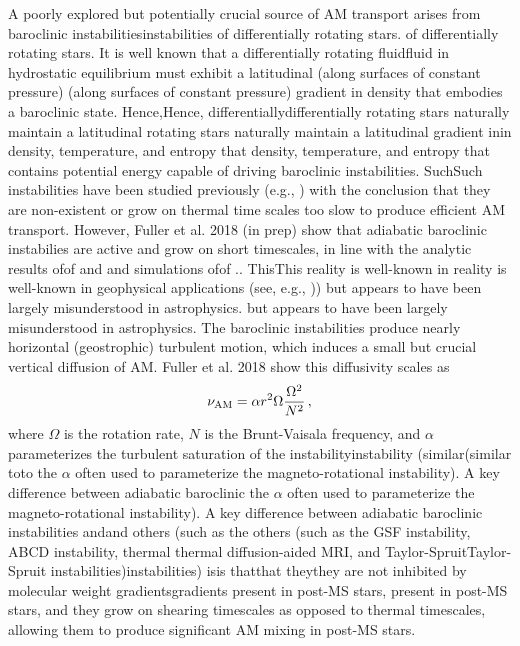 A poorly explored but potentially crucial source of AM transport arises from baroclinic instabilitiesinstabilities of differentially rotating stars. of differentially rotating stars. It is well known that a differentially rotating fluidfluid in hydrostatic equilibrium must exhibit a latitudinal (along surfaces of constant pressure) (along surfaces of constant pressure) gradient in density that embodies a baroclinic state. Hence,Hence, differentiallydifferentially rotating stars naturally maintain a latitudinal rotating stars naturally maintain a latitudinal gradient inin density, temperature, and entropy that density, temperature, and entropy that contains potential energy capable of driving baroclinic instabilities. SuchSuch instabilities have been studied previously (e.g., \citealt{goldreich:67,knobloch:82,knobloch:83,spruit:83,spruit:84,zahn:93}) with the conclusion that they are non-existent or grow on thermal time scales too slow to produce efficient AM transport. However, Fuller et al. 2018 (in prep) show that adiabatic baroclinic instabilies are active and grow on short timescales, in line with the analytic results ofof \citep{tassoul:82,fujimoto:87,fujimoto:88} and \citep{tassoul:82,fujimoto:87,fujimoto:88} and simulations ofof \cite{simitev:17}.\cite{simitev:17}. ThisThis reality is well-known in reality is well-known in geophysical applications (see, e.g., \citealt{pedlosky:92})\citealt{pedlosky:92}) but appears to have been largely misunderstood in astrophysics. but appears to have been largely misunderstood in astrophysics. The baroclinic instabilities produce nearly horizontal (geostrophic) turbulent motion, which induces a small but crucial vertical diffusion of AM. Fuller et al. 2018 show this diffusivity scales as
\begin{equation}
\label{numri} 
\nu_{\rm AM} = \alpha r^2 \Omega \frac{\Omega^2}{N^2} \, ,
\end{equation}
where $\Omega$ is the rotation rate, $N$ is the Brunt-Vaisala frequency, and $\alpha$ parameterizes the turbulent saturation of the instabilityinstability (similar(similar toto the $\alpha$ often used to parameterize the magneto-rotational instability). A key difference between adiabatic baroclinic the $\alpha$ often used to parameterize the magneto-rotational instability). A key difference between adiabatic baroclinic instabilities andand others (such as the others (such as the GSF instability, ABCD instability, thermal thermal diffusion-aided MRI, and Taylor-SpruitTaylor-Spruit instabilities)instabilities) isis thatthat theythey are not inhibited by molecular weight gradientsgradients present in post-MS stars, present in post-MS stars, and they grow on shearing timescales as opposed to thermal timescales, allowing them to produce significant AM mixing in post-MS stars.





